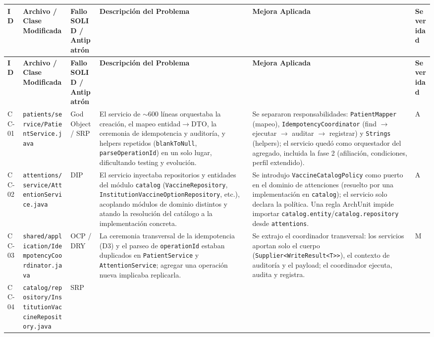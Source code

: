 \documentclass[11pt,a4paper]{article}
\begin{document}
\begin{footnotesize}
\begin{longtable}{@{}p{0.9cm}p{3.1cm}p{2.4cm}p{3.5cm}p{3.7cm}p{1.0cm}@{}}
\toprule
\textbf{ID} & \textbf{Archivo / Clase Modificada} &
\textbf{Fallo SOLID / Antipatrón} & \textbf{Descripción del Problema} &
\textbf{Mejora Aplicada} & \textbf{Severidad} \\
\midrule
\endfirsthead
\toprule
\textbf{ID} & \textbf{Archivo / Clase Modificada} &
\textbf{Fallo SOLID / Antipatrón} & \textbf{Descripción del Problema} &
\textbf{Mejora Aplicada} & \textbf{Severidad} \\
\midrule
\endhead
CC-01 & \texttt{patients/service/PatientService.java} & God Object / SRP &
El servicio de $\sim$600 líneas orquestaba la creación, el mapeo entidad{}${}\to{}$DTO, la ceremonia de idempotencia y auditoría, y helpers repetidos (\texttt{blankToNull}, \texttt{parseOperationId}) en un solo lugar, dificultando testing y evolución. &
Se separaron responsabilidades: \texttt{PatientMapper} (mapeo), \texttt{IdempotencyCoordinator} (find $\to$ ejecutar $\to$ auditar $\to$ registrar) y \texttt{Strings} (helpers); el servicio quedó como orquestador del agregado, incluida la fase 2 (afiliación, condiciones, perfil extendido). &
A \\
CC-02 & \texttt{attentions/service/AttentionService.java} & DIP &
El servicio inyectaba repositorios y entidades del módulo \texttt{catalog} (\texttt{VaccineRepository}, \texttt{InstitutionVaccineOptionRepository}, etc.), acoplando módulos de dominio distintos y atando la resolución del catálogo a la implementación concreta. &
Se introdujo \texttt{VaccineCatalogPolicy} como puerto en el dominio de attenciones (resuelto por una implementación en \texttt{catalog}); el servicio solo declara la política. Una regla ArchUnit impide importar \texttt{catalog.entity}/\texttt{catalog.repository} desde \texttt{attentions}. &
A \\
CC-03 & \texttt{shared/application/IdempotencyCoordinator.java} & OCP / DRY &
La ceremonia transversal de la idempotencia (D3) y el parseo de \texttt{operationId} estaban duplicados en \texttt{PatientService} y \texttt{AttentionService}; agregar una operación nueva implicaba replicarla. &
Se extrajo el coordinador transversal: los servicios aportan solo el cuerpo (\texttt{Supplier\textless WriteResult\textless T\textgreater\textgreater}), el contexto de auditoría y el payload; el coordinador ejecuta, audita y registra. &
M \\
CC-04 & \texttt{catalog/repository/InstitutionVaccineRepository.java} & SRP &

\end{longtable}
\end{footnotesize}
\end{document}

